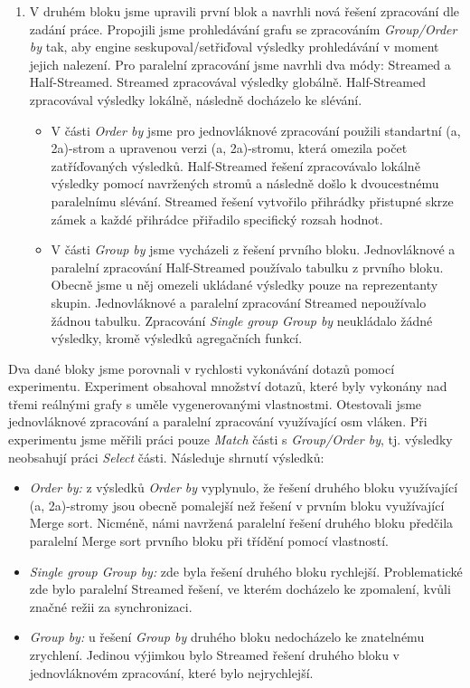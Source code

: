 \begin{enumerate}
\item
V druhém bloku jsme upravili první blok a navrhli nová řešení zpracování dle zadání práce.
Propojili jsme prohledávání grafu se zpracováním \textit{Group/Order by} tak, aby engine seskupoval/setřiďoval výsledky prohledávání v moment jejich nalezení.
Pro paralelní zpracování jsme navrhli dva módy: Streamed a Half-Streamed.
Streamed zpracovával výsledky globálně.
Half-Streamed zpracovával výsledky lokálně, následně docházelo ke slévání.
\begin{itemize}
\item V části \textit{Order by} jsme pro jednovláknové zpracování použili standartní (a, 2a)-strom a upravenou verzi (a, 2a)-stromu, která omezila počet zatříďovaných výsledků.  
Half-Streamed řešení zpracovávalo lokálně výsledky pomocí navržených stromů a následně došlo k dvoucestnému paralelnímu slévání.
Streamed řešení vytvořilo přihrádky přistupné skrze zámek a každé přihrádce přiřadilo specifický rozsah hodnot.
\item
V části \textit{Group by} jsme vycházeli z řešení prvního bloku.
Jednovláknové a paralelní zpracování Half-Streamed používalo tabulku z prvního bloku.
Obecně jsme u něj omezeli ukládané výsledky pouze na reprezentanty skupin.
Jednovláknové a paralelní zpracování Streamed nepoužívalo žádnou tabulku.
Zpracování \textit{Single group Group by} neukládalo žádné výsledky, kromě výsledků agregačních funkcí.
\end{itemize}
\end{enumerate}

Dva dané bloky jsme porovnali v rychlosti vykonávání dotazů pomocí experimentu.
Experiment obsahoval množství dotazů, které byly vykonány nad třemi reálnými grafy s uměle vygenerovanými vlastnostmi.
Otestovali jsme jednovláknové zpracování a paralelní zpracování využívající osm vláken.
Při experimentu jsme měřili práci pouze \textit{Match} části s \textit{Group/Order by}, tj. výsledky neobsahují práci \textit{Select} části.
Následuje shrnutí výsledků:
\begin{itemize}

\item \textit{Order by:} z výsledků \textit{Order by} vyplynulo, že řešení druhého bloku využívající (a, 2a)-stromy jsou obecně pomalejší než řešení v prvním bloku využívající Merge sort.
Nicméně, námi navržená paralelní řešení druhého bloku předčila paralelní Merge sort prvního bloku při třídění pomocí vlastností.

\item \textit{Single group Group by:} zde byla řešení druhého bloku rychlejší.
Problematické zde bylo paralelní Streamed řešení, ve kterém docházelo ke zpomalení, kvůli značné režii za synchronizaci.

\item \textit{Group by:} u řešení \textit{Group by} druhého bloku nedocházelo ke znatelnému zrychlení.
Jedinou výjimkou bylo Streamed řešení druhého bloku v jednovláknovém zpracování, které bylo nejrychlejší.

\end{itemize}

